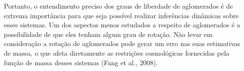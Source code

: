 Portanto, o entendimento preciso dos graus de liberdade de aglomerados é de extrema
importância para que seja possível realizar inferências dinâmicas sobre esses sistemas. Um
dos aspectos menos estudados a respeito de aglomerados é a possibilidade de que eles tenham
algum grau de rotação. Não levar em consideração a rotação de aglomerados pode gerar um
erro nas suas estimativas de massa, o que afeta diretamente as restrições cosmológicas
fornecidas pela função de massa desses sistemas (Fang et al., 2008).
